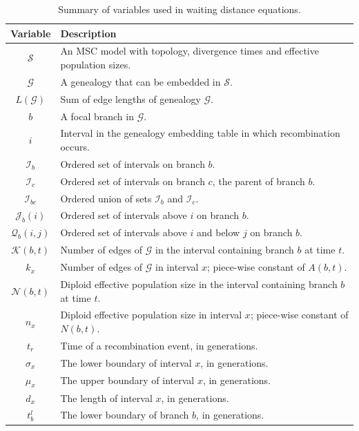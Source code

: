 \documentclass[11pt]{article}
\begin{document}
\begin{table}[!b]
\centering
\caption{\label{tab:table-notation} 
	Summary of variables used in waiting distance equations. 
}
\begin{tabular}[t]{ |c|l| }
	\toprule
	Variable & Description \\
	\midrule
	$\mathcal{S}$    & An MSC model with topology, divergence times and effective population sizes. \\
	$\mathcal{G}$    & A genealogy that can be embedded in $\mathcal{S}$. \\
	$L(\mathcal{G})$ & Sum of edge lengths of genealogy $\mathcal{G}$. \\
	$b$ 			  & A focal branch in $\mathcal{G}$. \\
	$i$              & Interval in the genealogy embedding table in which recombination occurs.\\
	$\mathcal{I}_b$  & Ordered set of intervals on branch $b$.\\
	$\mathcal{I}_{c}$   & Ordered set of intervals on branch $c$, the parent of branch $b$.\\
	$\mathcal{I}_{bc}$  & Ordered union of sets $\mathcal{I}_{b}$ and $\mathcal{I}_{c}$.\\
	$\mathcal{J}_b(i)$  & Ordered set of intervals above $i$ on branch $b$.\\	
	$\mathcal{Q}_b(i,j)$ & Ordered set of intervals above $i$ and below $j$ on branch $b$.\\
	$\mathcal{K}(b,t)$ & Number of edges of $\mathcal{G}$ in the interval containing branch $b$ at time $t$.\\
	$k_x$              & Number of edges of $\mathcal{G}$ in interval $x$; piece-wise constant of $A(b,t)$.\\
	$\mathcal{N}(b,t)$ & Diploid effective population size in the interval containing branch $b$ at time $t$.\\
	$n_x$              & Diploid effective population size in interval $x$; piece-wise constant of $N(b,t)$. \\
	$t_r$		& Time of a recombination event, in generations. \\
	$\sigma_x$     & The lower boundary of interval $x$, in generations. \\
	$\mu_x$        & The upper boundary of interval $x$, in generations. \\	
	$d_x$          & The length of interval $x$, in generations. \\
	$t_b^l$        & The lower boundary of branch $b$, in generations. \\

\end{tabular}
\end{table}
\end{document}
